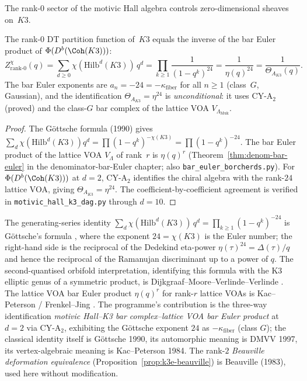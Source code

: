 The rank-$0$ sector of the motivic Hall algebra controls zero-dimensional sheaves on~$K3$.

\begin{proposition}[Rank-\texorpdfstring{$0$}{0} DT = bar Euler inverse]
\label{prop:k3e-dt-bar-rank0}
The rank-$0$ DT partition function of~$K3$ equals the inverse of the bar Euler product of $\Phi(D^b(\Coh(K3)))$:
\[
 Z^{\chi}_{\mathrm{rank\text{-}0}}(q)
 = \sum_{d \geq 0} \chi(\mathrm{Hilb}^d(K3)) \, q^d
 = \prod_{k \geq 1} \frac{1}{(1-q^k)^{24}}
 = \frac{1}{\eta(q)^{24}}
 = \frac{1}{\Theta_{A_{K3}}(q)}.
\]
The bar Euler exponents are $a_n = -24 = -\kappa_{\mathrm{fiber}}$ for all $n \geq 1$ (class~$G$, Gaussian), and the identification $\Theta_{A_{K3}} = \eta^{24}$ is \emph{unconditional}: it uses CY-A$_2$ (proved) and the class-$G$ bar complex of the lattice VOA $V_{\Lambda_{\mathrm{Muk}}}$.
\end{proposition}

\begin{proof}
The G\"ottsche formula (1990) gives $\sum_d \chi(\mathrm{Hilb}^d(K3)) q^d = \prod (1-q^k)^{-\chi(K3)} = \prod(1-q^k)^{-24}$. The bar Euler product of the lattice VOA $V_\Lambda$ of rank~$r$ is $\eta(q)^r$ (Theorem~\ref{thm:denom-bar-euler} in the denominator-bar-Euler chapter; also \texttt{bar\_euler\_borcherds.py}). For $\Phi(D^b(\Coh(K3)))$ at $d=2$, CY-A$_2$ identifies the chiral algebra with the rank-$24$ lattice VOA, giving $\Theta_{A_{K3}} = \eta^{24}$. The coefficient-by-coefficient agreement is verified in \texttt{motivic\_hall\_k3\_dag.py} through $d = 10$.
\end{proof}

\begin{remark}
\label{rem:k3e-dt-bar-rank0-classical}
The generating-series identity
$\sum_d \chi(\mathrm{Hilb}^d(K3)) \, q^d = \prod_{k \geq 1} (1 - q^k)^{-24}$
is G\"ottsche's formula \cite{Gottsche1990}, where the exponent $24 = \chi(K3)$
is the Euler number; the right-hand side is the reciprocal of the
Dedekind eta-power $\eta(\tau)^{24} = \Delta(\tau)/q$ and hence the
reciprocal of the Ramanujan discriminant up to a power of $q$. The
second-quantised orbifold interpretation, identifying this formula with
the K3 elliptic genus of a symmetric product, is
Dijkgraaf--Moore--Verlinde--Verlinde \cite{DMVV}. The lattice VOA bar
Euler product $\eta(q)^r$ for rank-$r$ lattice VOAs is Kac--Peterson
\cite{KacPeterson1984} / Frenkel--Jing \cite{FrenkelJing1988}.
The programme's contribution is the three-way identification
\emph{motivic Hall--K3 bar complex--lattice VOA bar Euler product}
at $d = 2$ via CY-A$_2$, exhibiting the G\"ottsche exponent $24$ as
$-\kappa_{\mathrm{fiber}}$ (class $G$); the classical identity itself is
G\"ottsche 1990, its automorphic meaning is DMVV 1997, its
vertex-algebraic meaning is Kac--Peterson 1984. The rank-$2$
\textit{Beauville deformation equivalence} (Proposition~\ref{prop:k3e-beauville})
is Beauville (1983), used here without modification.
\end{remark}

